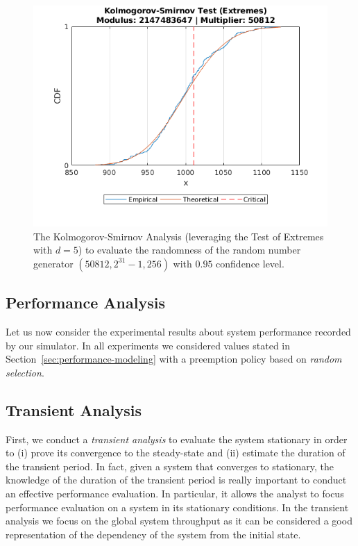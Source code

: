 \begin{figure}
	\includegraphics[width=\columnwidth]{fig/evaluation-randomness-kolmogorov-smirnov-50812}
	\caption{The Kolmogorov-Smirnov Analysis (leveraging the Test of Extremes with $d=5$) to evaluate the randomness of the random number generator $(50812,2^{31}-1, 256)$ with $0.95$ confidence level.}
	\label{fig:evaluation-randomness-kolmogorov-smirnov-50812}
\end{figure}


\subsection{Performance Analysis}
Let us now consider the experimental results about system performance recorded by our simulator.
In all experiments we considered values stated in Section~\ref{sec:performance-modeling} with a preemption policy based on \textit{random selection}.

\subsection{Transient Analysis}
\label{sec:evaluation-transient-analysis}
First, we conduct a \textit{transient analysis} to evaluate the system stationary in order to (i) prove its convergence to the steady-state and (ii) estimate the duration of the transient period.
%
In fact, given a system that converges to stationary, the knowledge of the duration of the transient period is really important to conduct an effective performance evaluation. In particular, it allows the analyst to focus performance evaluation on a system in its stationary conditions.
%
In the transient analysis we focus on the global system throughput as it can be considered a good representation of the dependency of the system from the initial state.


